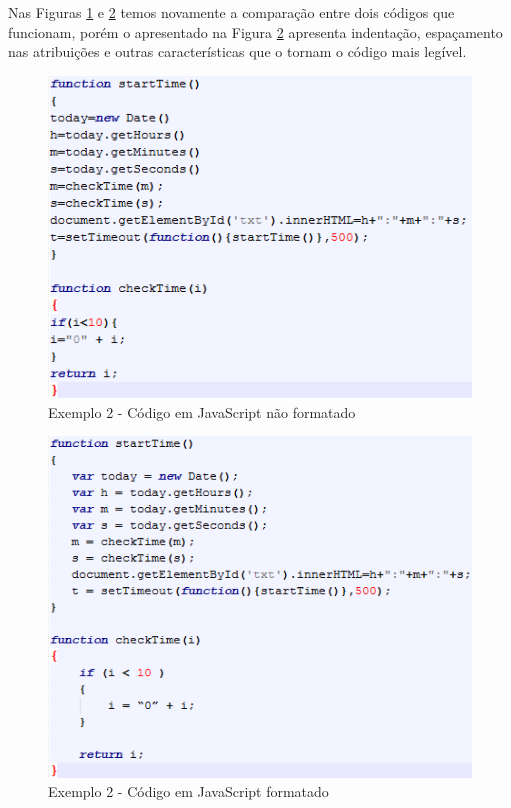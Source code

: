 \documentclass[12pt]{article}
\begin{document}
Nas Figuras \ref{fig:Exemplo 2 - Código em JavaScript não formatado} e \ref{fig:Exemplo 2 - Código em JavaScript formatado} temos novamente a comparação entre dois códigos que funcionam, porém o apresentado na Figura \ref{fig:Exemplo 2 - Código em JavaScript formatado} apresenta indentação, espaçamento nas atribuições e outras características que o tornam o código mais legível. 

\begin{figure}[!htbp]
	\caption{Exemplo 2 - Código em JavaScript não formatado}
	\label{fig:Exemplo 2 - Código em JavaScript não formatado}
	\centering%
	\begin{minipage}{.8\textwidth}
		\includegraphics[width=\textwidth]{exemplo2}
	\end{minipage}
\end{figure}

\newpage

\begin{figure}[!htbp]
	\caption{Exemplo 2 - Código em JavaScript formatado}
	\label{fig:Exemplo 2 - Código em JavaScript formatado}
	\centering%
	\begin{minipage}{.8\textwidth}
		\includegraphics[width=\textwidth]{exemplo2_ok}
	\end{minipage}
\end{figure}
\end{document}
